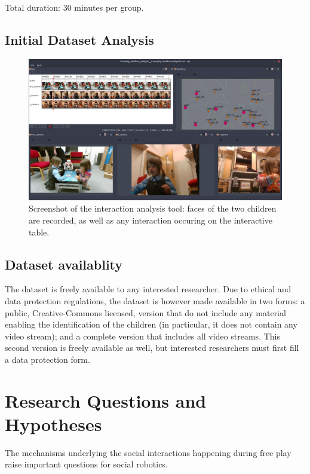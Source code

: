 \documentclass{article}
\begin{document}
Total duration: 30 minutes per group.
\subsection{Initial Dataset Analysis}

\begin{figure}
    \centering
    \includegraphics[width=\linewidth]{analysis}
    \caption{Screenshot of the interaction analysis tool: faces of the two
    children are recorded, as well as any interaction occuring on the
    interactive table.}
    \label{fig|analysis}
\end{figure}

\subsection{Dataset availablity}
\label{availablity}


The dataset is freely available to any interested researcher. Due to ethical
and data protection regulations, the dataset is however made available in two
forms: a public, Creative-Commons licensed, version that do not include any
material enabling the identification of the children (in particular, it does not
contain any video stream); and a complete version that includes all video
streams. This second version is freely available as well, but interested
researchers must first fill a data protection form.


\section{Research Questions and Hypotheses}

The mechanisms underlying the social interactions happening during free play
raise important questions for social robotics.
\end{document}
